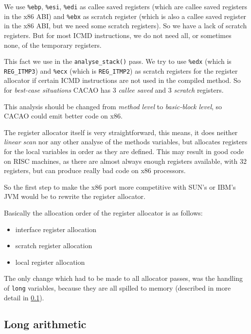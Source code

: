 We use \texttt{\%ebp}, \texttt{\%esi}, \texttt{\%edi} as callee saved
registers (which are callee saved registers in the x86 ABI) and
\texttt{\%ebx} as scratch register (which is also a callee saved
register in the x86 ABI, but we need some scratch registers). So we
have a lack of scratch registers. But for most ICMD instructions, we
do not need all, or sometimes none, of the temporary registers.

This fact we use in the \texttt{analyse\_stack()} pass. We try to use
\texttt{\%edx} (which is \texttt{REG\_ITMP3}) and \texttt{\%ecx} (which
is \texttt{REG\_ITMP2}) as scratch registers for the register
allocator if certain ICMD instructions are not used in the compiled
method. So for \textit{best-case situations} CACAO has 3
\textit{callee saved} and 3 \textit{scratch} registers.

This analysis should be changed from \textit{method level} to
\textit{basic-block level}, so CACAO could emit better code on x86.

The register allocator itself is very straightforward, this means, it
does neither \textit{linear scan} nor any other analyse of the methods
variables, but allocates registers for the local variables in order as
they are defined. This may result in good code on RISC machines, as
there are almost always enough registers available, with 32 registers,
but can produce really bad code on x86 processors.

So the first step to make the x86 port more competitive with SUN's or
IBM's JVM would be to rewrite the register allocator.

Basically the allocation order of the register allocator is as
follows:

\begin{itemize}
 \item interface register allocation
 \item scratch register allocation
 \item local register allocation
\end{itemize}

The only change which had to be made to all allocator passes, was the
handling of \texttt{long} variables, because they are all spilled to
memory (described in more detail in \ref{LongArithmetic}).


\subsection{Long arithmetic}\label{LongArithmetic}

